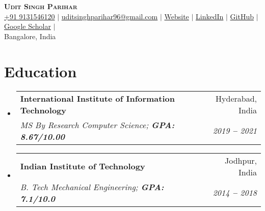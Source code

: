 \documentclass[letterpaper,11pt]{article}
\makeatletter
\newcommand{\resumeSubheading}[4]{
	\vspace{-2pt}\item
		\begin{tabular*}{0.97\textwidth}[t]{l@{\extracolsep{\fill}}r}
			\textbf{#1} & #2 \\
			\textit{\small#3} & \textit{\small #4} \\
		\end{tabular*}\vspace{-7pt}
}
\newcommand{\resumeEducationHeading}[4]{
	\vspace{-2pt}\item
		\begin{tabular*}{0.97\textwidth}[t]{l@{\extracolsep{\fill}}r}
			\textbf{#1} & #2 \\
			\textit{\small#3} & \textit{\small #4} \\
		\end{tabular*}\vspace{-5pt}
}
\newcommand{\resumeSubHeadingListStart}{\begin{itemize}[leftmargin=0.15in, label={}]}
\newcommand{\resumeSubHeadingListEnd}{\end{itemize}}
\makeatother
\begin{document}

\begin{center}
		\textbf{\Huge \scshape Udit Singh Parihar} \\ \vspace{3pt}
		\small
		\faMobile \hspace{.5pt} \href{tel:919131546120}{+91 9131546120}
		$|$
		\href{mailto:uditsinghparihar96@gmail.com}{\color{blue}\faAt \hspace{.5pt} uditsinghparihar96@gmail.com}
		$|$
		\href{https://udit.netlify.app/}{\color{blue}\faGlobe \hspace{.5pt} Website}
		$|$
		\href{https://www.linkedin.com/in/udit-singh-parihar-0bab24b7/}{\color{blue}\faLinkedinSquare \hspace{.5pt} LinkedIn}
		$|$
		\href{https://github.com/UditSinghParihar}{\color{blue}\faGithub \hspace{.5pt} GitHub}
		$|$
		\href{https://scholar.google.co.in/citations?user=fUeIp1EAAAAJ&hl=en}{\color{blue}\faGraduationCap \hspace{.5pt} Google Scholar}
		$|$\\
		\faMapMarker \hspace{.5pt} {Bangalore, India}
\end{center}




\section{Education}
	\vspace{3pt}
	\resumeSubHeadingListStart
		
		\resumeEducationHeading
			{International Institute of Information Technology}
			{Hyderabad, India}
			{MS By Research Computer Science;   \textbf{GPA: 8.67/10.00}}{2019 \textbf{--} 2021}
		
		\resumeSubheading
			{Indian Institute of Technology}
			{ Jodhpur, India}
			{B. Tech Mechanical Engineering;   \textbf{GPA: 7.1/10.0}}{2014 \textbf{--} 2018}
		
	\resumeSubHeadingListEnd

\end{document}
